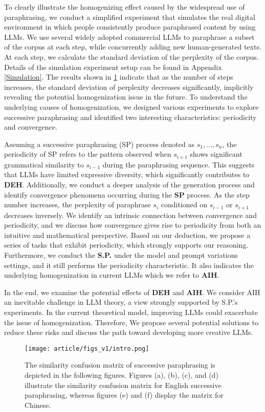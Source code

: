 To clearly illustrate the homogenizing effect caused by the widespread use of paraphrasing, we conduct a simplified experiment that simulates the real digital environment in which people consistently produce paraphrased content by using LLMs.
We use several widely adopted commercial LLMs to paraphrase a subset of the corpus at each step, while concurrently adding new human-generated texts.
At each step, we calculate the standard deviation of the perplexity of the corpus.
Details of the simulation experiment setup can be found in Appendix \ref{Simulation}.
The results shown in \ref{intro} indicate that as the number of steps increases, the standard deviation of perplexity decreases significantly, implicitly revealing the potential homogenization issue in the future.
To understand the underlying causes of homogenization, we designed various experiments to explore successive paraphrasing and identified two interesting characteristics: periodicity and convergence.

Assuming a successive paraphrasing (SP) process denoted as \( s_{1}, \dots, s_{n} \), the periodicity of SP refers to the pattern observed when \( s_{i+1} \) shows significant grammatical similarity to \( s_{i-1} \) during the paraphrasing sequence. 
This suggests that LLMs have limited expressive diversity, which significantly contributes to \textbf{DEH}.
Additionally, we conduct a deeper analysis of the generation process and identify convergence phenomena occurring during the \textbf{SP} process. 
As the step number increases, the perplexity of paraphrase \( s_{i} \) conditioned on \( s_{i-1} \) or \( s_{i+1} \) decreases inversely. 
We identify an intrinsic connection between convergence and periodicity, and we discuss how convergence gives rise to periodicity from both an intuitive and mathematical perspective.
Based on our deduction, we propose a series of tasks that exhibit periodicity, which strongly supports our reasoning.
Furthermore, we conduct the \textbf{S.P.} under the model and prompt variations settings, and it still performs the periodicity characteristic.
It also indicates the underlying homogenization in current LLMs which we refer to \textbf{AIH}.


In the end, we examine the potential effects of \textbf{DEH} and \textbf{AIH}. 
 We consider AIH an inevitable challenge in LLM theory, a view strongly supported by S.P.'s experiments.
In the current theoretical model, improving LLMs could exacerbate the issue of homogenization. 
Therefore, We propose several potential solutions to reduce these risks and discuss the path toward developing more creative LLMs.



\begin{figure}
    \centering
    \texttt{[image: article/figs\_v1/intro.png]}
    \caption{The similarity confusion matrix of successive paraphrasing is depicted in the following figures. Figures (a), (b), (c), and (d) illustrate the similarity confusion matrix for English successive paraphrasing, whereas figures (e) and (f) display the matrix for Chinese.} 
    \label{intro}
\end{figure}

